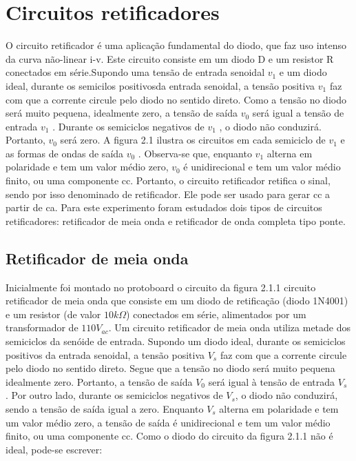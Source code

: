 \documentclass[a4paper]{article} %
\renewcommand{\thefigure}{\thesection.\arabic{figure}}
\begin{document}
\renewcommand{\thefigure}{\thesubsection.\arabic{figure}}

\newpage
\section{Circuitos retificadores}
 \setcounter{figure}{0}
O circuito retificador é uma aplicação fundamental do diodo, que faz uso intenso da curva não-linear i-v. Este circuito consiste em um diodo D e um resistor R conectados em série.Supondo uma tensão de entrada senoidal  $v_1$ e um diodo ideal, durante os semicilos positivosda entrada senoidal, a tensão positiva  $v_1$     faz com que a corrente circule pelo diodo no sentido
direto. Como a tensão no diodo será muito pequena, idealmente zero, a tensão de saída  $v_0$ será igual a tensão de entrada      $v_1$     . Durante os semiciclos negativos de    $v_1$    , o diodo não conduzirá. Portanto,   $v_0$     será zero. A figura 2.1 ilustra os circuitos em cada semiciclo de   $v_1$  e as formas de ondas de saída  $v_0$      .
        Observa-se que, enquanto  $v_1$        alterna em polaridade e tem um valor médio zero,     $v_0$   é unidirecional e tem um valor médio finito, ou uma componente cc. Portanto, o circuito retificador retifica o sinal, sendo por isso denominado de retificador. Ele pode ser usado para gerar cc a partir de ca.
         Para este experimento foram estudados dois tipos de circuitos retificadores: retificador
de meia onda e retificador de onda completa tipo ponte.
      
\subsection{Retificador de meia onda}
         Inicialmente foi montado no protoboard o circuito da figura 2.1.1 circuito retificador de meia onda que consiste em um diodo de retificação (diodo 1N4001) e um resistor (de valor $10k\Omega$) conectados em série, alimentados por um transformador de $110V_{ac}$.
         Um circuito retificador de meia onda utiliza metade dos semiciclos da senóide de entrada. Supondo um diodo ideal, durante os semiciclos positivos da entrada senoidal, a tensão positiva $V_s$ faz com que a corrente circule pelo diodo no sentido direto. Segue que a tensão no diodo será muito pequena idealmente zero. Portanto, a tensão de saída $V_0$ será igual à tensão de entrada $V_s$ . Por outro lado, durante os semiciclos negativos de $V_s$, o diodo não conduzirá, sendo a tensão de saída igual a zero. Enquanto $V_s$ alterna em polaridade e tem um valor médio zero, a tensão de saída é unidirecional e tem um valor médio finito, ou uma componente cc.
         Como o diodo do circuito da figura 2.1.1 não é ideal, pode-se escrever:
     
\end{document}
